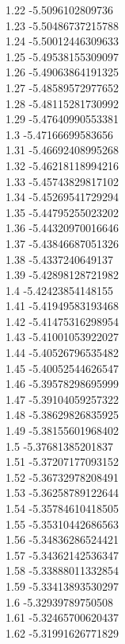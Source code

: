 {1.22	-5.5096102809736\\
1.23	-5.50486737215788\\
1.24	-5.50012446309633\\
1.25	-5.49538155309097\\
1.26	-5.49063864191325\\
1.27	-5.48589572977652\\
1.28	-5.48115281730992\\
1.29	-5.47640990553381\\
1.3	-5.47166699583656\\
1.31	-5.46692408995268\\
1.32	-5.46218118994216\\
1.33	-5.45743829817102\\
1.34	-5.45269541729294\\
1.35	-5.44795255023202\\
1.36	-5.44320970016646\\
1.37	-5.43846687051326\\
1.38	-5.4337240649137\\
1.39	-5.42898128721982\\
1.4	-5.42423854148155\\
1.41	-5.41949583193468\\
1.42	-5.41475316298954\\
1.43	-5.41001053922027\\
1.44	-5.40526796535482\\
1.45	-5.40052544626547\\
1.46	-5.39578298695999\\
1.47	-5.39104059257322\\
1.48	-5.38629826835925\\
1.49	-5.38155601968402\\
1.5	-5.37681385201837\\
1.51	-5.37207177093152\\
1.52	-5.36732978208491\\
1.53	-5.36258789122644\\
1.54	-5.35784610418505\\
1.55	-5.35310442686563\\
1.56	-5.34836286524421\\
1.57	-5.34362142536347\\
1.58	-5.33888011332854\\
1.59	-5.33413893530297\\
1.6	-5.32939789750508\\
1.61	-5.32465700620437\\
1.62	-5.31991626771829\\
}
